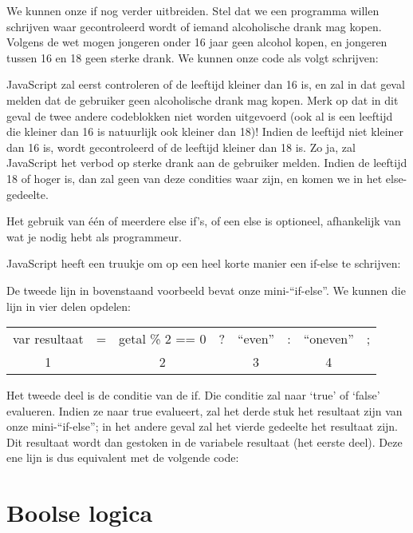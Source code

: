 We kunnen onze if nog verder uitbreiden. Stel dat we een programma willen schrijven waar gecontroleerd wordt of iemand alcoholische drank mag kopen. Volgens de wet mogen jongeren onder 16 jaar geen alcohol kopen, en jongeren tussen 16 en 18 geen sterke drank. We kunnen onze code als volgt schrijven:


JavaScript zal eerst controleren of de leeftijd kleiner dan 16 is, en zal in dat geval melden dat de gebruiker geen alcoholische drank mag kopen. Merk op dat in dit geval de twee andere codeblokken niet worden uitgevoerd (ook al is een leeftijd die kleiner dan 16 is natuurlijk ook kleiner dan 18)! Indien de leeftijd niet kleiner dan 16 is, wordt gecontroleerd of de leeftijd kleiner dan 18 is. Zo ja, zal JavaScript het verbod op sterke drank aan de gebruiker melden. Indien de leeftijd 18 of hoger is, dan zal geen van deze condities waar zijn, en komen we in het else-gedeelte.

Het gebruik van \'e\'en of meerdere else if's, of een else is optioneel, afhankelijk van wat je nodig hebt als programmeur.

JavaScript heeft een truukje om op een heel korte manier een if-else te schrijven:


De tweede lijn in bovenstaand voorbeeld bevat onze mini-``if-else''. We kunnen die lijn in vier delen opdelen:

\begin{center}
\begin{tabular}{c c c c c c c c}
var resultaat & = & getal \% 2 == 0 & ? & ``even'' & : & ``oneven'' & ; \\
\cline{1-1} \cline{3-3} \cline{5-5} \cline{7-7}
1 & & 2 & & 3 & & 4 & \\
\end{tabular}
\end{center}

Het tweede deel is de conditie van de if. Die conditie zal naar `true' of `false' evalueren. Indien ze naar true evalueert, zal het derde stuk het resultaat zijn van onze mini-``if-else''; in het andere geval zal het vierde gedeelte het resultaat zijn. Dit resultaat wordt dan gestoken in de variabele resultaat (het eerste deel). Deze ene lijn is dus equivalent met de volgende code:


\section{Boolse logica}

